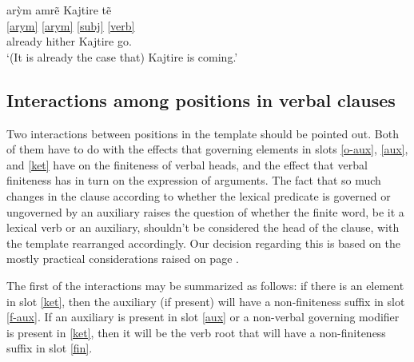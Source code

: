 \documentclass[output=paper]{langscibook}
\begin{document}
\ea\label{thetic}\glll arỳm amrẽ Kajtire tẽ\\
     \ref{arym} \ref{arym} \ref{subj} \ref{verb}\\
     already hither Kajtire go.\Fin{}\\
  \glt `(It is already the case that) Kajtire is coming.'
\z



\subsection{Interactions among positions in verbal clauses}

Two interactions between positions in the template should be pointed out. Both of them have to do with the effects that governing elements in slots \ref{o-aux}, \ref{aux}, and \ref{ket} have on the finiteness of verbal heads, and the effect that verbal finiteness has in turn on the expression of arguments. The fact that so much changes in the clause according to whether the lexical predicate is governed or ungoverned by an auxiliary raises the question of whether the finite word, be it a lexical verb or an auxiliary, shouldn't be considered the head of the clause, with the template rearranged accordingly. Our decision regarding this is based on the mostly practical considerations raised on page \pageref{complexity}. 


The first of the interactions may be summarized as follows: if there is an element in slot \ref{ket}, then the auxiliary (if present) will have a non-finiteness suffix in slot \ref{f-aux}. If an auxiliary is present in slot \ref{aux} or a non-verbal governing modifier is present in \ref{ket}, then it will be the verb root that will have a non-finiteness suffix in slot \ref{fin}.

\end{document}
